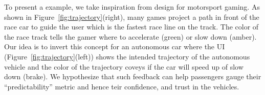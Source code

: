 To present a example, we take inspiration from design for motorsport gaming. As shown in Figure~\ref{fig:trajectory}(right), many games project a path in front of the race car to guide the user which is the fastest race line on the track. The color of the race track tells the gamer where to accelerate (green) or slow down (amber). Our idea is to invert this concept for an autonomous car where the UI (Figure~\ref{fig:trajectory}(left)) shows the intended trajectory of the autonomous vehicle and the color of the trajectory coveys if the car will speed up of slow down (brake). We hypothesize that such feedback can help passengers gauge their ``predictability'' metric and hence teir confidence, and trust in the vehicles. 
